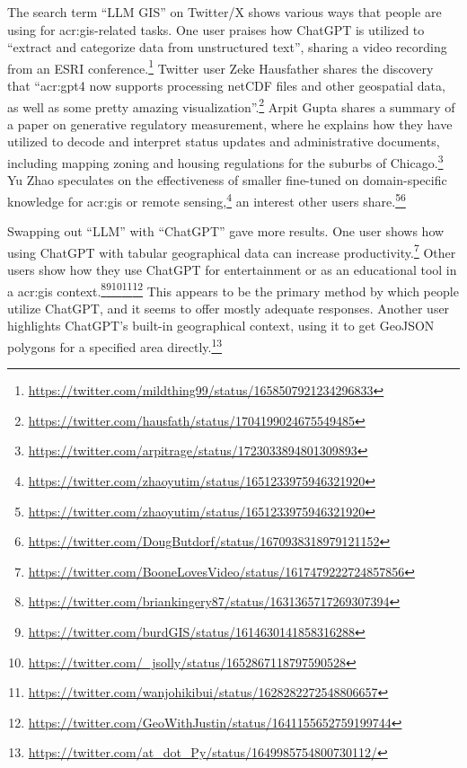 The search term \enquote{LLM GIS} on Twitter/X shows various ways that people are using  for \acrshort{acr:gis}-related tasks. One user praises how ChatGPT is utilized to \enquote{extract and categorize data from unstructured text}, sharing a video recording from an ESRI conference.\footnote{\url{https://twitter.com/mildthing99/status/1658507921234296833}} Twitter user Zeke Hausfather shares the discovery that \enquote{\acrshort{acr:gpt}4 now supports processing netCDF files and other geospatial data, as well as some pretty amazing visualization}.\footnote{\url{https://twitter.com/hausfath/status/1704199024675549485}} Arpit Gupta shares a summary of a paper on generative regulatory measurement, where he explains how they have utilized  to decode and interpret status updates and administrative documents, including mapping zoning and housing regulations for the suburbs of Chicago.\footnote{\url{https://twitter.com/arpitrage/status/1723033894801309893}} Yu Zhao speculates on the effectiveness of smaller  fine-tuned on domain-specific knowledge for \acrshort{acr:gis} or remote sensing,\footnote{\url{https://twitter.com/zhaoyutim/status/1651233975946321920}} an interest other users share.\footnote{\url{https://twitter.com/zhaoyutim/status/1651233975946321920}}\footnote{\url{https://twitter.com/DougButdorf/status/1670938318979121152}}

Swapping out \enquote{LLM} with \enquote{ChatGPT} gave more results. One user shows how using ChatGPT with tabular geographical data can increase productivity.\footnote{\url{https://twitter.com/BooneLovesVideo/status/1617479222724857856}} Other users show how they use ChatGPT for entertainment or as an educational tool in a \acrshort{acr:gis} context.\footnote{\url{https://twitter.com/briankingery87/status/1631365717269307394}}\footnote{\url{https://twitter.com/burdGIS/status/1614630141858316288}}\footnote{\url{https://twitter.com/_jsolly/status/1652867118797590528}}\footnote{\url{https://twitter.com/wanjohikibui/status/1628282272548806657}}\footnote{\url{https://twitter.com/GeoWithJustin/status/1641155652759199744}} This appears to be the primary method by which people utilize ChatGPT, and it seems to offer mostly adequate responses. Another user highlights ChatGPT's built-in geographical context, using it to get GeoJSON polygons for a specified area directly.\footnote{\url{https://twitter.com/at_dot_Py/status/1649985754800730112/}}

